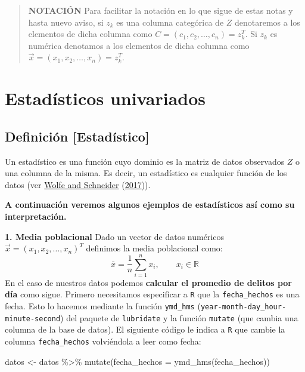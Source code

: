\documentclass[
]{book}
\newenvironment{Shaded}{\begin{snugshade}}{\end{snugshade}}
\newcommand{\AttributeTok}[1]{\textcolor[rgb]{0.77,0.63,0.00}{#1}}
\newcommand{\FunctionTok}[1]{\textcolor[rgb]{0.00,0.00,0.00}{#1}}
\newcommand{\NormalTok}[1]{#1}
\newcommand{\OtherTok}[1]{\textcolor[rgb]{0.56,0.35,0.01}{#1}}
\newcommand{\SpecialCharTok}[1]{\textcolor[rgb]{0.00,0.00,0.00}{#1}}
\begin{document}
\begin{quote}
\textbf{NOTACIÓN}
Para facilitar la notación en lo que sigue de estas notas y hasta nuevo aviso, si \(z_k\) es una columna categórica de \(Z\) denotaremos a los elementos de dicha columna como \(C = (c_1, c_2, \dots, c_n) = z_k^T\). Si \(z_k\) es numérica denotamos a los elementos de dicha columna como \(\vec{x} = (x_1, x_2, \dots, x_n) = z_k^T\).
\end{quote}

\hypertarget{estaduxedsticos-univariados}{%
\section{Estadísticos univariados}\label{estaduxedsticos-univariados}}

\hypertarget{definiciuxf3n-estaduxedstico}{%
\subsection{Definición {[}Estadístico{]}}\label{definiciuxf3n-estaduxedstico}}

Un estadístico es una función cuyo dominio es la matriz de datos observados \(Z\) o una columna de la misma. Es decir, un estadístico es cualquier función de los datos (ver \protect\hyperlink{ref-wolfe2017intuitive}{Wolfe and Schneider} (\protect\hyperlink{ref-wolfe2017intuitive}{2017})).

\textbf{A continuación veremos algunos ejemplos de estadísticos así como su interpretación.}

\textbf{1. Media poblacional} Dado un vector de datos numéricos \(\vec{x} = (x_1, x_2, \dots, x_n)^T\) definimos la media poblacional como:
\[
  \bar{x} = \dfrac{1}{n} \sum\limits_{i=1}^{n} x_i, \qquad x_i \in \mathbb{R}
  \]
En el caso de nuestros datos podemos \textbf{calcular el promedio de delitos por día} como sigue. Primero necesitamos especificar a \texttt{R} que la \texttt{fecha\_hechos} es una fecha. Esto lo hacemos mediante la función \texttt{ymd\_hms} (\texttt{year-month-day\_hour-minute-second}) del paquete de \texttt{lubridate} y la función \texttt{mutate} (que cambia una columna de la base de datos). El siguiente código le indica a \texttt{R} que cambie la columna \texttt{fecha\_hechos} volviéndola a leer como fecha:

\begin{Shaded}
\begin{Highlighting}[]
\NormalTok{datos }\OtherTok{\textless{}{-}}\NormalTok{ datos }\SpecialCharTok{\%\textgreater{}\%} \FunctionTok{mutate}\NormalTok{(}\AttributeTok{fecha\_hechos =} \FunctionTok{ymd\_hms}\NormalTok{(fecha\_hechos))}
\end{Highlighting}
\end{Shaded}
\end{document}
